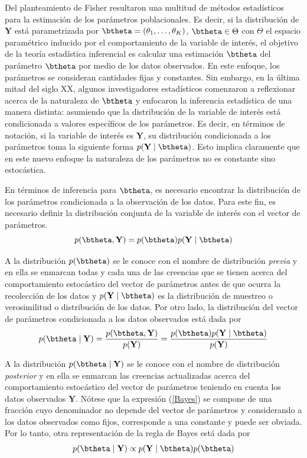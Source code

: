 \documentclass[10pt,openright]{book}\usepackage[]{graphicx}\usepackage[]{color}
\begin{document}
Del planteamiento de Fisher resultaron una multitud de métodos estadísticos para la estimación de los parámetros poblacionales. Es decir, si la distribución de $\mathbf{Y}$ está parametrizada por $\btheta=(\theta_1,\ldots,\theta_K)$, $\btheta \in \Theta$ con $\Theta$ el espacio paramétrico inducido por el comportamiento de la variable de interés, el objetivo de la teoría estadística inferencial es calcular una estimación $\hat{\btheta}$ del parámetro $\btheta$ por medio de los datos observados. En este enfoque, los parámetros se consideran cantidades fijas y constantes. Sin embargo, en la última mitad del siglo XX, algunos investigadores estadísticos comenzaron a reflexionar acerca de la naturaleza de $\btheta$ y enfocaron la inferencia estadística de una manera distinta: asumiendo que la distribución de la variable de interés está condicionada a valores específicos de los parámetros. Es decir, en términos de notación, si la variable de interés es $\mathbf{Y}$, su distribución condicionada a los parámetros toma la siguiente forma $p(\mathbf{Y} \mid \btheta)$. Esto implica claramente que en este nuevo enfoque la naturaleza de los parámetros no es constante sino estocástica.

En términos de inferencia para $\btheta$, es necesario encontrar la distribución de los parámetros condicionada a la observación de los datos. Para este fin, es necesario definir la distribución conjunta de la variable de interés con el vector de parámetros.
\begin{equation*}
p(\btheta,\mathbf{Y})=p(\btheta)p(\mathbf{Y} \mid \btheta)
\end{equation*}

A la distribución $p(\btheta)$ se le conoce con el nombre de distribución \emph{previa} y en ella se enmarcan todas y cada una de las creencias que se tienen acerca del comportamiento estocástico del vector de parámetros antes de que ocurra la recolección de los datos y $p(\mathbf{Y} \mid \btheta)$ es la distribución de muestreo o verosimilitud o distribución de los datos. Por otro lado, la distribución del vector de parámetros condicionada a los datos observados está dada por
\begin{equation}\label{Bayes}
p(\btheta \mid \mathbf{Y})=\frac{p(\btheta,\mathbf{Y})}{p(\mathbf{Y})}=\frac{p(\btheta)p(\mathbf{Y} \mid \btheta)}{p(\mathbf{Y})}
\end{equation}

A la distribución $p(\btheta \mid \mathbf{Y})$ se le conoce con el nombre de distribución \emph{posterior} y en ella se enmarcan las creencias actualizadas acerca del comportamiento estocástico del vector de parámetros teniendo en cuenta los datos observados $\mathbf{Y}$. Nótese que la expresión (\ref{Bayes}) se compone de una fracción cuyo denominador no depende del vector de parámetros y considerando a los datos observados como fijos, corresponde a una constante y puede ser obviada. Por lo tanto, otra representación de la regla de Bayes está dada por
\begin{align}\label{Bayes1}
p(\btheta \mid \mathbf{Y})\propto p(\mathbf{Y} \mid \btheta)p(\btheta)
\end{align}
\end{document}
